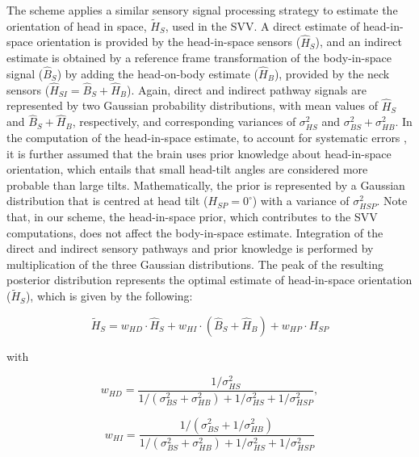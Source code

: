 The scheme applies a similar sensory signal processing strategy to estimate the orientation of head in space, $\tilde{H}_S$, used in the SVV. A direct estimate of head-in-space orientation is provided by the head-in-space sensors ($\hat{H}_S$), and an indirect estimate is obtained by a reference frame transformation of the body-in-space signal ($\hat{B}_S$) by adding the head-on-body estimate ($\hat{H}_B$), provided by the neck sensors ($\hat{H}_{SI} = \hat{B}_S + \hat{H}_B$). Again, direct and indirect pathway signals are represented by two Gaussian probability distributions, with mean values of $\hat{H}_S$ and $\hat{B}_S + \hat{H}_B$, respectively, and corresponding variances of $\sigma^2_{HS}$ and $\sigma^2_{BS} + \sigma^2_{HB}$. In the computation of the head-in-space estimate, to account for systematic errors \cite{macneilage2007, devrijer2008}, it is further assumed that the brain uses prior knowledge about head-in-space orientation, which entails that small head-tilt angles are considered more probable than large tilts. Mathematically, the prior is represented by a Gaussian distribution that is centred at  head tilt ($H_{SP} = 0^\circ$) with a variance of $\sigma^2_{HSP}$. Note that, in our scheme, the head-in-space prior, which contributes to the SVV computations, does not affect the body-in-space estimate. Integration of the direct and indirect sensory pathways and prior knowledge is performed by multiplication of the three Gaussian distributions. The peak of the resulting posterior distribution represents the optimal estimate of head-in-space orientation ($\tilde{H}_S$), which is given by the following:

\begin{equation}
\label{p1:eqn6}
\tilde{H}_S = w_{HD} \cdot \hat{H}_S + w_{HI} \cdot (\hat{B}_S + \hat{H}_B) + w_{HP} \cdot H_{SP}
\end{equation}

with

\begin{equation}
\label{p1:eqn7}
w_{HD} = \frac{1 / \sigma^2_{HS}}{1 / (\sigma^2_{BS} + \sigma^2_{HB}) + 1/\sigma^2_{HS} + 1/\sigma^2_{HSP}},
\end{equation}

\begin{equation}
\label{p1:eqn8}
w_{HI} = \frac{1 / (\sigma^2_{BS} + 1/\sigma^2_{HB})}{1 / (\sigma^2_{BS} + \sigma^2_{HB}) + 1/\sigma^2_{HS} + 1/\sigma^2_{HSP}}
\end{equation}

